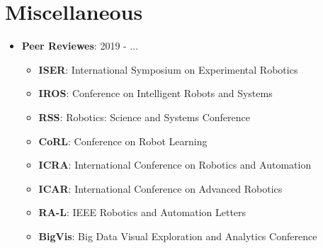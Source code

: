 \documentclass[letterpaper,11pt]{article}
\newcommand{\resumeItem}[2]{
\item\small{
		\textbf{#1}{: #2 \vspace{-2pt}}
	}
}
\newcommand{\resumeSubItem}[2]{\resumeItem{#1}{#2}\vspace{-4pt}}
\newcommand{\resumeSubHeadingListStart}{\begin{itemize}[leftmargin=*,label=]}
\newcommand{\resumeSubHeadingListEnd}{\end{itemize}}
\newcommand{\resumeItemListStart}{\begin{itemize}[label=$\bullet$]}
\newcommand{\resumeItemListEnd}{\end{itemize}\vspace{-5pt}}
\begin{document}
\section{Miscellaneous}
\resumeSubHeadingListStart
\resumeSubItem{Peer Reviewes}{2019 - ...}
\resumeItemListStart
\resumeItem{ISER}{International Symposium on Experimental Robotics}
\resumeItem{IROS}{Conference on Intelligent Robots and Systems}
\resumeItem{RSS}{Robotics: Science and Systems Conference}
\resumeItem{CoRL}{Conference on Robot Learning}
\resumeItem{ICRA}{International Conference on Robotics and Automation}
\resumeItem{ICAR}{International Conference on Advanced Robotics}
\resumeItem{RA-L}{IEEE Robotics and Automation Letters}
\resumeItem{BigVis}{Big Data Visual Exploration and Analytics Conference}

\resumeItemListEnd
\resumeSubHeadingListEnd

\end{document}
